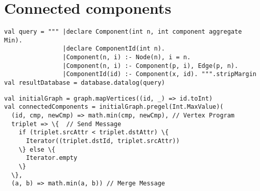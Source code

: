\section{Connected components}
\begin{Verbatim}[label=Connected components - SparkDatalog]
val query = """ |declare Component(int n, int component aggregate Min).
                |declare ComponentId(int n).
                |Component(n, i) :- Node(n), i = n.
                |Component(n, i) :- Component(p, i), Edge(p, n).
                |ComponentId(id) :- Component(x, id). """.stripMargin
val resultDatabase = database.datalog(query)
\end{Verbatim}

\vspace{0.4cm}

\begin{Verbatim}[label=Connected components - Spark]
val initialGraph = graph.mapVertices((id, _) => id.toInt)
val connectedComponents = initialGraph.pregel(Int.MaxValue)(
  (id, cmp, newCmp) => math.min(cmp, newCmp), // Vertex Program
  triplet => \{  // Send Message
    if (triplet.srcAttr < triplet.dstAttr) \{
      Iterator((triplet.dstId, triplet.srcAttr))
    \} else \{
      Iterator.empty
    \}
  \},
  (a, b) => math.min(a, b)) // Merge Message
\end{Verbatim}


